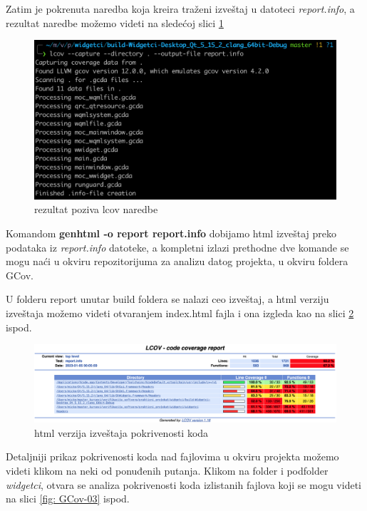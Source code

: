 \documentclass[a4paper]{article}
\begin{document}
Zatim je pokrenuta naredba koja kreira traženi izveštaj u datoteci \textit{report.info}, a rezultat naredbe možemo videti na sledećoj slici \ref{fig: GCov-01}

\begin{figure}[h!]
\begin{center}
\includegraphics[scale=0.45]{GCov-01.png}
\end{center}
\caption{rezultat poziva lcov naredbe}
\label{fig: GCov-01}
\end{figure}

Komandom \textbf{genhtml -o report report.info} dobijamo html izveštaj preko podataka iz \textit{report.info} datoteke, a kompletni izlazi prethodne dve komande se mogu naći u okviru repozitorijuma za analizu datog projekta, u okviru foldera GCov.

U folderu report unutar build foldera se nalazi ceo izveštaj, a html verziju izveštaja možemo videti otvaranjem index.html fajla i ona izgleda kao na slici \ref{fig: GCov-02} ispod.

\begin{figure}[h!]
\begin{center}
\includegraphics[scale=0.23]{GCov-02.png}
\end{center}
\caption{html verzija izveštaja pokrivenosti koda}
\label{fig: GCov-02}
\end{figure}

Detaljniji prikaz pokrivenosti koda nad fajlovima u okviru projekta možemo videti klikom na neki od ponuđenih putanja. Klikom na folder i podfolder \textit{widgetci}, otvara se analiza pokrivenosti koda izlistanih fajlova koji se mogu videti na slici \ref{fig: GCov-03} ispod.
\end{document}
